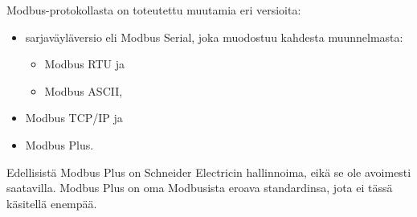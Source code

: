     Modbus-protokollasta on toteutettu muutamia eri versioita:
    \begin{itemize}
      \item sarjaväyläversio eli Modbus Serial, joka muodostuu kahdesta muunnelmasta:
      \begin{itemize}
        \item Modbus \gls{RTU} ja
        \item Modbus ASCII,
      \end{itemize}
      \item Modbus TCP/IP ja
      \item Modbus Plus.
      \parencite{modbusAppSpec}
    \end{itemize}
    Edellisistä Modbus Plus on Schneider Electricin hallinnoima, eikä se ole avoimesti saatavilla. Modbus Plus on oma Modbusista eroava standardinsa, jota ei tässä käsitellä enempää. \parencite{seCom}


